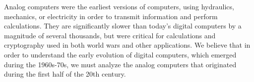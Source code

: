 \documentclass[../computer-history.tex]{subfiles}
\begin{document}
\centering


Analog computers were the earliest versions of computers, using hydraulics, mechanics, or electricity in order to transmit information and perform calculations. They are significantly
slower than today's digital computers by a magnitude of several thousands, but were critical for calculations and cryptography used in both world wars and other applications.
We believe that in order to understand the early evolution of digital computers, which emerged during the 1960s-70s, we must analyze the analog computers that originated
during the first half of the 20th century.



\end{document}
